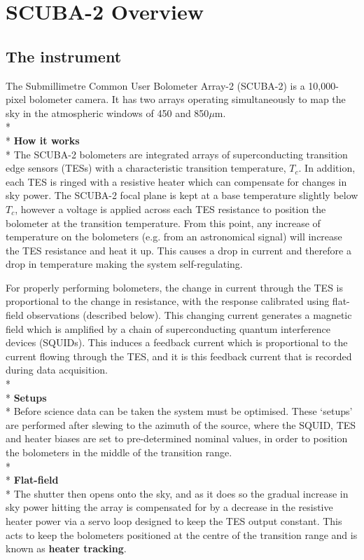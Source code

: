 \documentclass[twoside,11pt]{article}
\newcommand{\xlabel}[1]{}
\renewcommand{\_}{\texttt{\symbol{95}}}
\begin{document}
\clearpage
\section{\xlabel{scuba2_overview}SCUBA-2 Overview}
\label{sec:s2}
\subsection{\xlabel{scuba2}The instrument}


The Submillimetre Common User Bolometer Array-2 (SCUBA-2) is a
10,000-pixel bolometer camera. It has two arrays operating simultaneously to map
the sky in the atmospheric windows of 450 and 850$\mu$m.
\\*\\*
\textbf{How it works}\\*
The SCUBA-2 bolometers are integrated arrays of superconducting
transition edge sensors (TESs) with a characteristic transition
temperature, $T_c$. In addition, each TES is ringed with a resistive
heater which can compensate for changes in sky power. The SCUBA-2
focal plane is kept at a base temperature slightly below $T_c$,
however a voltage is applied across each TES resistance to position
the bolometer at the transition temperature. From this point, any
increase of temperature on the bolometers (e.g. from an astronomical
signal) will increase the TES resistance and heat it up. This causes a
drop in current and therefore a drop in temperature making the system
self-regulating.

For properly performing bolometers, the change in current through the
TES is proportional to the change in resistance, with the response
calibrated using flat-field observations (described below). This
changing current generates a magnetic field which is amplified by a
chain of superconducting quantum interference devices (SQUIDs). This
induces a feedback current which is proportional to the current
flowing through the TES, and it is this feedback current that is
recorded during data acquisition.
\\*\\*
\textbf{Setups}\\*
Before science data can be taken the system must be optimised. These
`setups' are performed after slewing to the azimuth of the source,
where the SQUID, TES and heater biases are set to pre-determined
nominal values, in order to position the bolometers in the middle of
the transition range.
\\*\\*
\textbf{Flat-field}\\*
 The shutter then opens onto the sky, and
as it does so the gradual increase in sky power hitting the array is
compensated for by a decrease in the resistive heater power via a
servo loop designed to keep the TES output constant. This acts to keep
the bolometers positioned at the centre of the transition range and is
known as \textbf{heater tracking}.
\end{document}
